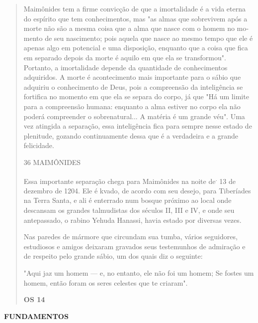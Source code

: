\begin{quote}
Maimônides tem a firme convicção de que a imortalidade é a vida eterna
do espírito que tem conhecimentos, mas "as almas que sobrevivem após a
morte não são a mesma coisa que a alma que nasce com o homem no mo­mento
de seu nascimento; pois aquela que nasce ao mesmo tempo que ele é apenas
algo em potencial e uma disposição, enquanto que a coisa que fica em
separado depois da morte é aquilo em que ela se transformou". Portanto,
a imor­talidade depende da quantidade de conhecimentos adquiridos. A
morte é acon­tecimento mais importante para o sábio que adquiriu o
conhecimento de Deus, pois a compreensão da inteligência se fortifica no
momento em que ela se sepa­ra do corpo, já que "Há um limite para a
compreensão humana: enquanto a alma estiver no corpo ela não poderá
compreender o sobrenatural... A matéria é um grande véu". Uma vez
atingida a separação, essa inteligência fica para sem­pre nesse estado
de plenitude, gozando continuamente dessa que é a verdadei­ra e a grande
felicidade.

36 MAIMÔNIDES

Essa importante separação chega para Maimônides na noite
de\textsuperscript{.} 13 de dezembro de 1204. Ele é kvado, de acordo com
seu desejo, para Tiberíades na Terra Santa, e ali é enterrado num bosque
próximo ao local onde descan­sam os grandes talmudistas dos séculos II,
III e IV, e onde seu antepassado, o rabino Yehuda Hanassi, havia estado
por diversas vezes.

Nas paredes de mármore que circundam sua tumba, vários seguido­res,
estudiosos e amigos deixaram gravados seus testemunhos de admiração e de
respeito pelo grande sábio, um dos quais diz o seguinte:

"Aqui jaz um homem --- e, no entanto, ele não foi um homem; Se fostes um
homem, então foram os seres celestes que te criaram".

\textbf{OS 14}
\end{quote}

\textbf{FUNDAMENTOS}

